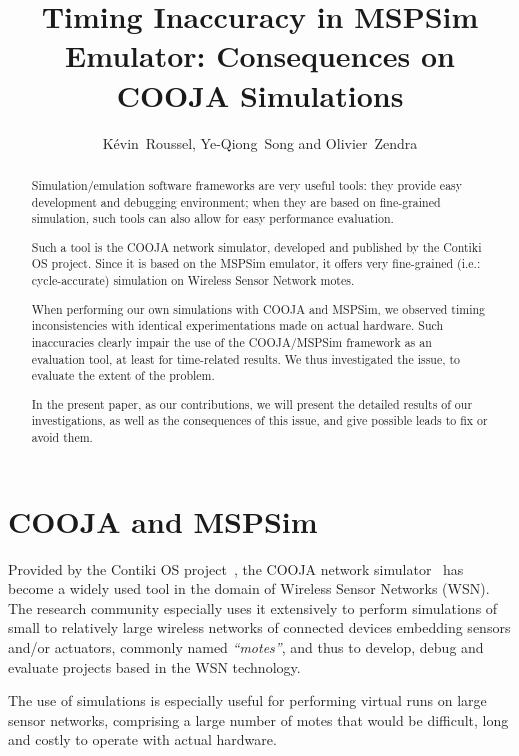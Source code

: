 \documentclass[10pt,final,journal,twocolumn]{IEEEtran}
\title{Timing Inaccuracy in MSPSim Emulator: Consequences on COOJA Simulations}
\author{
K\'evin~Roussel, Ye-Qiong~Song and Olivier~Zendra%
}
\date{}
\begin{document}
\maketitle


\begin{abstract}
Simulation/emulation software frameworks are very useful tools: they provide
easy development and debugging environment; when they are based on
fine-grained simulation, such tools can also allow for easy performance
evaluation.

Such a tool is the COOJA network simulator, developed and published by the
Contiki OS project. Since it is based on the MSPSim emulator, it offers
very fine-grained (i.e.: cycle-accurate) simulation on Wireless Sensor
Network motes.

When performing our own simulations with COOJA and MSPSim, we observed timing
inconsistencies with identical experimentations made on actual hardware.
Such inaccuracies clearly impair the use of the COOJA/MSPSim framework as
an evaluation tool, at least for time-related results. We thus investigated
the issue, to evaluate the extent of the problem.

In the present paper, as our contributions, we will present the detailed
results of our investigations, as well as the consequences of this issue,
and give possible leads to fix or avoid them.
\end{abstract}



\section{COOJA and MSPSim}
\label{introduction}

Provided by the Contiki OS project~\cite{ContikiOS}, the COOJA network
simulator~\cite{Cooja} has become a widely used tool in the domain of
Wireless Sensor Networks (WSN). The research community especially uses
it extensively to perform simulations of small to relatively large wireless
networks of connected devices embedding sensors and/or actuators, commonly
named \emph{``motes''}, and thus to develop, debug and evaluate projects
based in the WSN technology.

The use of simulations is especially useful for performing virtual runs
on large sensor networks, comprising a large number of motes that would
be difficult, long and costly to operate with actual hardware.
\end{document}
